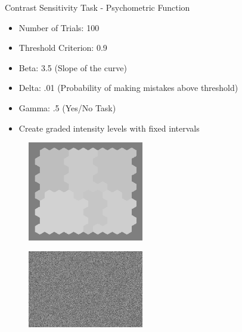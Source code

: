 \documentclass[10pt,xcolor=svgnames]{beamer} %
\begin{document}
\begin{frame}{Contrast Sensitivity Task - Psychometric Function}
    \begin{itemize}
        \item Number of Trials:	  100
        \item Threshold Criterion: 0.9
        \item Beta:		  3.5 (Slope of the curve)
        \item Delta\Lapse:	 .01 (Probability of making mistakes above threshold)
        \item Gamma:		 .5 (Yes/No Task)        
        \item Create graded intensity levels with fixed intervals
    \end{itemize}
\end{frame}

\begin{frame}[standout]
\begin{figure}
\end{figure}
\end{frame}

\begin{frame}[standout]
\begin{figure}
    \centering
    \includegraphics[width=0.45\textwidth]{pictures/grid_init4.png}
    \label{fig:exp_Img}
\end{figure}
\end{frame}

\begin{frame}[standout]
\begin{figure}
    \centering
    \includegraphics[width=0.45\textwidth]{pictures/mask.png}
\end{figure}
\end{frame}
\end{document}
